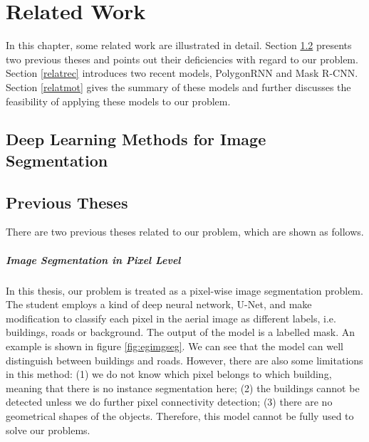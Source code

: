 \chapter{Related Work}

In this chapter, some related work are illustrated in detail. Section \ref{relatpre} presents two previous theses and points out their deficiencies with regard to our problem. Section \ref{relatrec} introduces two recent models, PolygonRNN and Mask R-CNN. Section \ref{relatmot} gives the summary of these models and further discusses the feasibility of applying these models to our problem.

\section{Deep Learning Methods for Image Segmentation}\label{dlimgseg}

\section{Previous Theses}\label{relatpre}

There are two previous theses related to our problem, which are shown as follows.

\paragraph{Image Segmentation in Pixel Level}
In this thesis, our problem is treated as a pixel-wise image segmentation problem. The student employs a kind of deep neural network, U-Net, and make modification to classify each pixel in the aerial image as different labels, i.e. buildings, roads or background. The output of the model is a labelled mask. An example is shown in figure \ref{fig:egimgseg}. We can see that the model can well distinguish between buildings and roads. However, there are also some limitations in this method: (1) we do not know which pixel belongs to which building, meaning that there is no instance segmentation here; (2) the buildings cannot be detected unless we do further pixel connectivity detection; (3) there are no geometrical shapes of the objects. Therefore, this model cannot be fully used to solve our problems.

